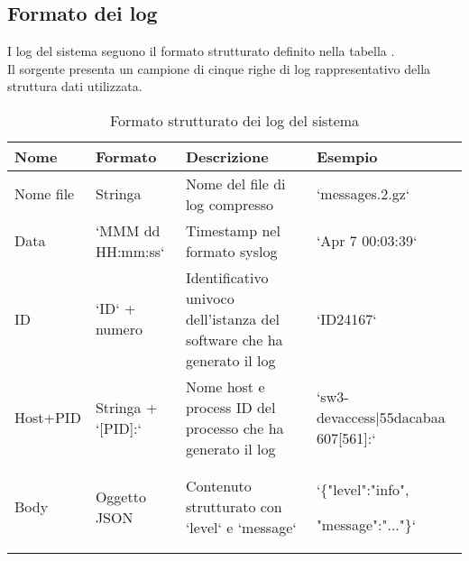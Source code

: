 \documentclass[12pt]{report}
\begin{document}
\clearpage

\subsection{Formato dei log}
\label{subsec:formato_log}

I log del sistema seguono il formato strutturato definito nella tabella . \\
Il sorgente  presenta un campione di cinque righe di log rappresentativo della struttura dati utilizzata.

\begin{table}[h!]
    \centering
    \begin{tabular}{|p{}|p{}|p{}|p{}|}
        \hline
        \textbf{Nome} & \textbf{Formato}   & \textbf{Descrizione}                                                    & \textbf{Esempio}                    \\
        \hline
        Nome file     & Stringa            & Nome del file di log compresso                                          & `messages.2.gz`                     \\
        \hline
        Data          & `MMM dd HH:mm:ss`  & Timestamp nel formato syslog                                            & `Apr  7 00:03:39`                   \\
        \hline
        ID            & `ID` + numero      & Identificativo univoco dell'istanza del software che ha generato il log & `ID24167`                           \\
        \hline
        Host+PID      & Stringa + `[PID]:` & Nome host e process ID del processo che ha generato il log              & `sw3-devaccess|55dacabaa 607[561]:` \\
        \hline
        Body          & Oggetto JSON       & Contenuto strutturato con `level` e `message`                           & `\{"level":"info",

        "message":"..."\}`                                                                                                                                 \\
        \hline
    \end{tabular}
    \caption{Formato strutturato dei log del sistema}
    \label{tab:formato_log}
\end{table}


\end{document}
